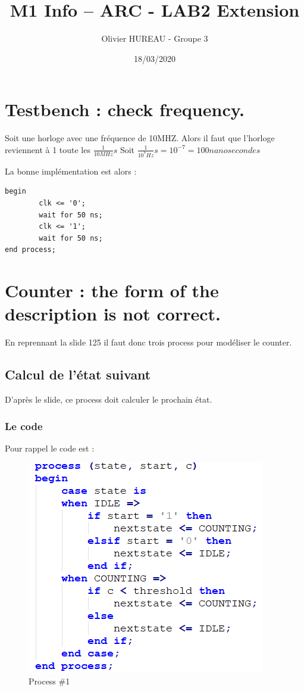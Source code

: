 \documentclass{article}
\title{M1 Info – ARC - LAB2 Extension}
\author{Olivier HUREAU - Groupe 3}
\date{18/03/2020}
\begin{document}
\maketitle

\section{Testbench : check frequency. }

Soit une horloge avec une fréquence de 10MHZ. Alors il faut que l'horloge reviennent à 1 toute les 
$\frac{1}{10MHz} s$
Soit $\frac{1}{10^{7}Hz}s = 10^{-7} = 100 nanosecondes$

La bonne implémentation est alors : 

\begin{verbatim}
begin
		clk <= '0';
		wait for 50 ns;
		clk <= '1';
		wait for 50 ns;
end process;
\end{verbatim}


\section{Counter : the form of the description is not correct. }

En reprennant la slide 125 il faut donc trois process pour modéliser le counter.

\subsection{Calcul de l'état suivant}

D'après le slide, ce process doit calculer le prochain état.

\subsubsection{Le code}
Pour rappel le code est : 

\begin{figure}[!h]
\advance\leftskip-0.4cm
\includegraphics[scale=0.6]{nextState.PNG}
\caption{Process \#1}
\end{figure}
\end{document}
